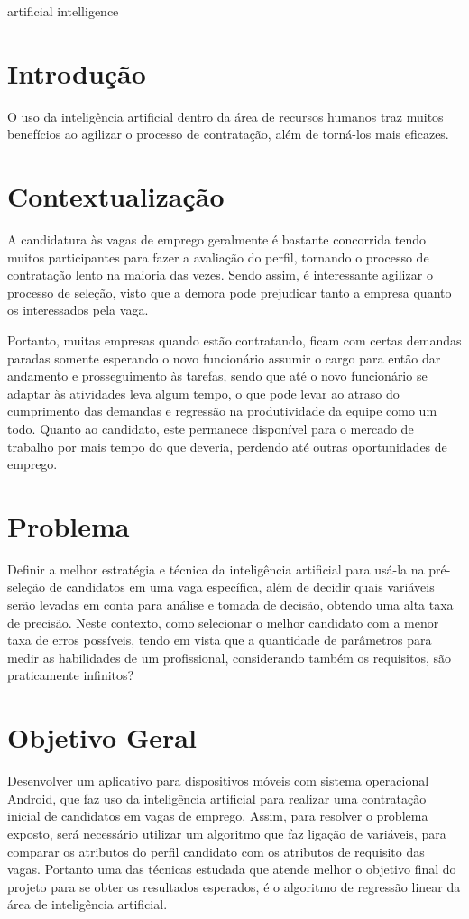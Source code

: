 \documentclass[conference]{IEEEtran}
\begin{document}
\begin{IEEEkeywords}
artificial intelligence
\end{IEEEkeywords}

\section{Introdução}
O uso da inteligência artificial dentro da área de recursos humanos traz muitos benefícios ao agilizar o processo de contratação, além de torná-los mais eficazes. 

\section{Contextualização}

A candidatura às vagas de emprego geralmente é bastante concorrida tendo muitos participantes para fazer a avaliação do perfil, tornando o processo de contratação lento na maioria das vezes. Sendo assim, é interessante agilizar o processo de seleção, visto que a demora pode prejudicar tanto a empresa quanto os interessados pela vaga.

Portanto, muitas empresas quando estão contratando, ficam com certas demandas paradas somente esperando o novo funcionário assumir o cargo para então dar andamento e prosseguimento às tarefas, sendo que até o novo funcionário se adaptar às atividades leva algum tempo, o que pode levar ao atraso do cumprimento das demandas e regressão na produtividade da equipe como um todo. Quanto ao candidato, este permanece disponível para o mercado de trabalho por mais tempo do que deveria, perdendo até outras oportunidades de emprego. 

\section{Problema}
Definir a melhor estratégia e técnica da inteligência artificial para usá-la na pré-seleção de candidatos em uma vaga específica, além de decidir quais variáveis serão levadas em conta para análise e tomada de decisão, obtendo uma alta taxa de precisão. Neste contexto, como selecionar o melhor candidato com a menor taxa de erros possíveis, tendo em vista que a quantidade de parâmetros para medir as habilidades de um profissional, considerando também os requisitos, são praticamente infinitos?

\section{Objetivo Geral}
Desenvolver um aplicativo para dispositivos móveis com sistema operacional Android, que faz uso da inteligência artificial para realizar uma contratação inicial de candidatos em vagas de emprego. Assim, para resolver o problema exposto, será necessário utilizar um algoritmo que faz ligação de variáveis, para comparar os atributos do perfil candidato com os atributos de requisito das vagas. Portanto uma das técnicas estudada que atende melhor o objetivo final do projeto para se obter os resultados esperados, é o algoritmo de regressão linear da área de inteligência artificial.
\end{document}
